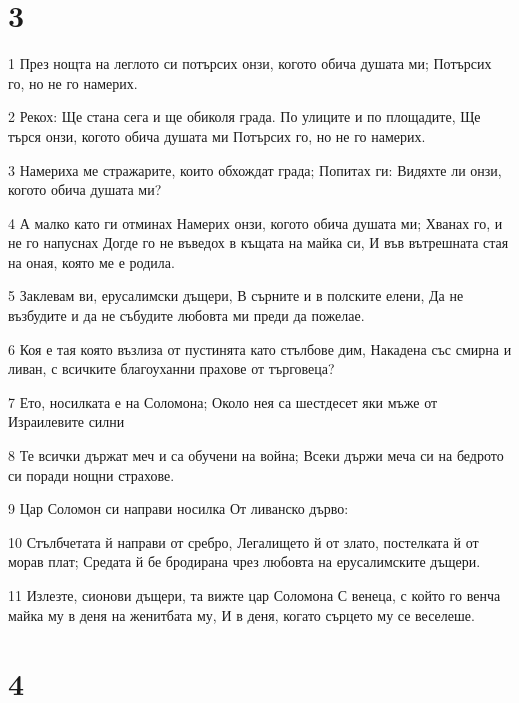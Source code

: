 \chapter{3}

\par 1 През нощта на леглото си потърсих онзи, когото обича душата ми; Потърсих го, но не го намерих.
\par 2 Рекох: Ще стана сега и ще обиколя града. По улиците и по площадите, Ще търся онзи, когото обича душата ми Потърсих го, но не го намерих.
\par 3 Намериха ме стражарите, които обхождат града; Попитах ги: Видяхте ли онзи, когото обича душата ми?
\par 4 А малко като ги отминах Намерих онзи, когото обича душата ми; Хванах го, и не го напуснах Догде го не въведох в къщата на майка си, И във вътрешната стая на оная, която ме е родила.
\par 5 Заклевам ви, ерусалимски дъщери, В сърните и в полските елени, Да не възбудите и да не събудите любовта ми преди да пожелае.
\par 6 Коя е тая която възлиза от пустинята като стълбове дим, Накадена със смирна и ливан, с всичките благоуханни прахове от търговеца?
\par 7 Ето, носилката е на Соломона; Около нея са шестдесет яки мъже от Израилевите силни
\par 8 Те всички държат меч и са обучени на война; Всеки държи меча си на бедрото си поради нощни страхове.
\par 9 Цар Соломон си направи носилка От ливанско дърво:
\par 10 Стълбчетата й направи от сребро, Легалището й от злато, постелката й от морав плат; Средата й бе бродирана чрез любовта на ерусалимските дъщери.
\par 11 Излезте, сионови дъщери, та вижте цар Соломона С венеца, с който го венча майка му в деня на женитбата му, И в деня, когато сърцето му се веселеше.

\chapter{4}

